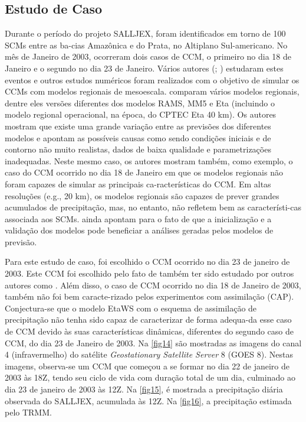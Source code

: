 \subsection{Estudo de Caso}

Durante o período do projeto SALLJEX, foram identificados em torno de 100 SCMs entre as ba-cias Amazônica e do Prata, no Altiplano Sul-americano. No mês de Janeiro de 2003, ocorreram dois casos de CCM, o primeiro no dia 18 de Janeiro e o segundo no dia 23 de Janeiro. Vários autores (\cite{zipseretal04}; \cite{herdiesetal04}) estudaram estes eventos e outros estudos numéricos foram realizados com o objetivo de simular os CCMs com modelos regionais de mesoescala.  comparam vários modelos regionais, dentre eles versões diferentes dos modelos RAMS, MM5 e Eta (incluindo o modelo regional operacional, na época, do CPTEC Eta 40 km). Os autores mostram que existe uma grande variação entre as previsões dos diferentes modelos e apontam as possíveis causas como sendo condições iniciais e de contorno não muito realistas, dados de baixa qualidade e parametrizações inadequadas. Neste mesmo caso, os autores mostram também, como exemplo, o caso do CCM ocorrido no dia 18 de Janeiro em que os modelos regionais não foram capazes de simular as principais ca-racterísticas do CCM. Em altas resoluções (e.g., 20 km), os modelos regionais são capazes de prever grandes acumulados de precipitação, mas, no entanto, não refletem bem as característi-cas associada aos SCMs.  ainda apontam para o fato de que a inicialização e a validação dos modelos pode beneficiar a análises geradas pelos modelos de previsão.

Para este estudo de caso, foi escolhido o CCM ocorrido no dia 23 de janeiro de 2003. Este CCM foi escolhido pelo fato de também ter sido estudado por outros autores como . Além disso, o caso de CCM ocorrido no dia 18 de Janeiro de 2003, também não foi bem caracte-rizado pelos experimentos com assimilação (CAP). Conjectura-se que o modelo EtaWS com o esquema de assimilação de precipitação não tenha sido capaz de caracterizar de forma adequa-da esse caso de CCM devido às suas características dinâmicas, diferentes do segundo caso de CCM, do dia 23 de Janeiro de 2003.
Na \autoref{fig14} são mostradas as imagens do canal 4 (infravermelho) do satélite \textit{Geostationary Satellite Server}  8 (GOES 8). Nestas imagens, observa-se um CCM que começou a se formar no dia 22 de janeiro de 2003 às 18Z, tendo seu ciclo de vida com duração total de um dia, culminado ao dia 23 de janeiro de 2003 às 12Z. Na \autoref{fig15}, é mostrada a precipitação diária observada do SALLJEX, acumulada às 12Z. Na \autoref{fig16}, a precipitação estimada pelo TRMM.

